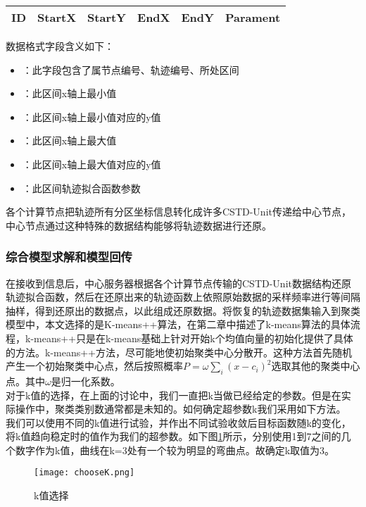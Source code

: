 \begin{tabular}{|c|c|c|c|c|c|}
\hline ID&StartX&StartY&EndX&EndY&Parament\\
\hline
\end{tabular}

数据格式字段含义如下：\\

\begin{itemize}
\item {}：此字段包含了属节点编号、轨迹编号、所处区间
\item {}：此区间x轴上最小值
\item {}：此区间x轴上最小值对应的y值
\item {}：此区间x轴上最大值
\item {}：此区间x轴上最大值对应的y值
\item {}：此区间轨迹拟合函数参数
\end{itemize}

各个计算节点把轨迹所有分区坐标信息转化成许多CSTD-Unit传递给中心节点，中心节点通过这种特殊的数据结构能够将轨迹数据进行还原。


\subsubsection{综合模型求解和模型回传}

在接收到信息后，中心服务器根据各个计算节点传输的CSTD-Unit数据结构还原轨迹拟合函数，然后在还原出来的轨迹函数上依照原始数据的采样频率进行等间隔抽样，得到还原出的数据点，以此组成还原数据。将恢复的轨迹数据集输入到聚类模型中，本文选择的是K-means++算法，在第二章中描述了k-means算法的具体流程，k-means++只是在k-means基础上针对开始k个均值向量的初始化提供了具体的方法。k-means++方法，尽可能地使初始聚类中心分散开。这种方法首先随机产生一个初始聚类中心点，然后按照概率$P=\omega \sum_i{\left( x-c_i \right) ^2}$选取其他的聚类中心点。其中$\omega$是归一化系数。\\
对于k值的选择，在上面的讨论中，我们一直把k当做已经给定的参数。但是在实际操作中，聚类类别数通常都是未知的。如何确定超参数k我们采用如下方法。\\

我们可以使用不同的k值进行试验，并作出不同试验收敛后目标函数随k的变化，将k值趋向稳定时的值作为我们的超参数。如下图\ref{chooseK}所示，分别使用1到7之间的几个数字作为k值，曲线在k=3处有一个较为明显的弯曲点。故确定k取值为3。\\

\begin{figure}[h]
	\texttt{[image: chooseK.png]}
	\caption{k值选择}
	\label{chooseK}
\end{figure}

